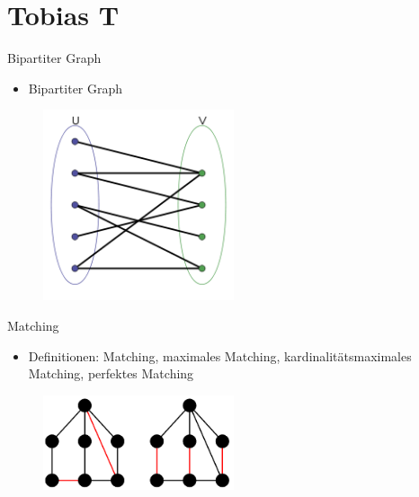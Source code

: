 \documentclass[18pt]{beamer}
\begin{document}
\section{Tobias T}
\begin{frame}{Bipartiter Graph}
\begin{itemize}
\item Bipartiter Graph
\end{itemize}
\begin{figure}
\includegraphics[width = 0.5\textwidth] {img/TobiasT_Bipartit.jpg}
\end{figure}
\end{frame}

\begin{frame}{Matching}
\begin{itemize}
\item Definitionen: Matching, maximales Matching, kardinalit\"atsmaximales Matching, perfektes Matching
\end{itemize}
\begin{figure}
\includegraphics[width = 0.5\textwidth]{img/TobiasT_Matching.jpg}
\end{figure}
\end{frame}
\end{document}
